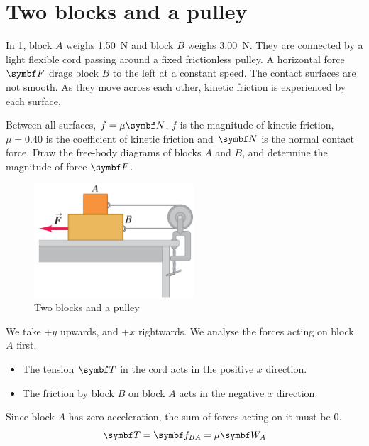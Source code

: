 \section{Two blocks and a pulley}
\begin{problem}
  In \cref{fig:twoblocks}, block \(A\) weighs \qty{1.50}{\newton} and
  block \(B\) weighs
  \qty{3.00}{\newton}. They are connected by a light flexible cord
  passing around a
  fixed frictionless pulley. A horizontal force \(\mv{F}\) drags block
  \(B\) to the left at a constant speed. The contact surfaces are not smooth. As
  they move across each other, kinetic friction is experienced by each surface.

  Between all surfaces, \(f = \mu\mv{N}\). \(f\) is the magnitude
  of kinetic friction, \(\mu=\num{0.40}\) is the coefficient of kinetic friction
  and \(\mv{N}\) is the normal contact force. Draw the free-body
  diagrams of blocks \(A\)
  and \(B\), and determine the magnitude of force \(\mv{F}\).
\end{problem}
\begin{figure}
  \centering
  \includegraphics[width=0.53\textwidth]{assets/twoblocks.png}
  \caption{Two blocks and a pulley}
  \label{fig:twoblocks}
\end{figure}
We take \(+y\) upwards, and \(+x\) rightwards.
We analyse the forces acting on block \(A\) first.
\begin{itemize}
  \item The tension \(\mv{T}\) in the cord acts in the positive \(x\) direction.
  \item The friction by block \(B\) on block \(A\) acts in the
    negative \(x\) direction.
\end{itemize}
Since block \(A\) has zero acceleration, the sum of forces acting on
it must be \(0\).
\begin{equation}
  \mv{T} = \mv{f}_{BA} = \mu \mv{W}_A
  \label{eq:fbdA}
\end{equation}

